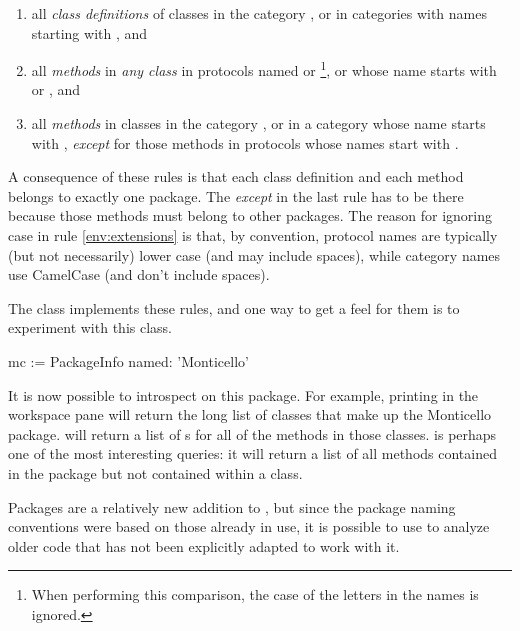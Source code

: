 \documentclass[a4paper,10pt,twoside]{book}
\begin{document}
\begin{enumerate}		
	\item{} all \emph{class definitions} of classes in the category , or in categories with names starting with , and
	\item{} \label{env:extensions} all \emph{methods} in \emph{any class} in protocols named  or \footnote{When performing this comparison, the case of the letters in the names is ignored.}, or whose name starts with  or , and
	\item{} all \emph{methods} in classes in the category , or in a category whose name starts with , \emph{except} for those methods in protocols whose names start with \prot{*}.
	
\end{enumerate}
\noindent
A consequence of these rules is that each class definition and each method belongs to exactly one package. The \emph{except} in the last rule has to be there because those methods must belong to other packages.   The reason for ignoring case in rule \ref{env:extensions} is that, by convention, protocol names are typically (but not necessarily) lower case (and may include spaces), while category names use CamelCase (and don't include spaces).

The class  implements these rules, and one way to get a feel for them is to experiment with this class.


\begin{code}{}
mc := PackageInfo named: 'Monticello'
\end{code}

It is now possible to introspect on this package. 
For example, printing  in the workspace pane will return the long list of classes that make up the Monticello package.  
will return a list of s for all of the methods in those classes.  is perhaps one of the most interesting queries: it will return a list of all methods contained in the  package but not contained within a  class.

Packages are a relatively new addition to \pharo, but since the package naming conventions were based on those already in use, it is possible to use  to analyze older code that has not been explicitly adapted to work with it.
\end{document}
